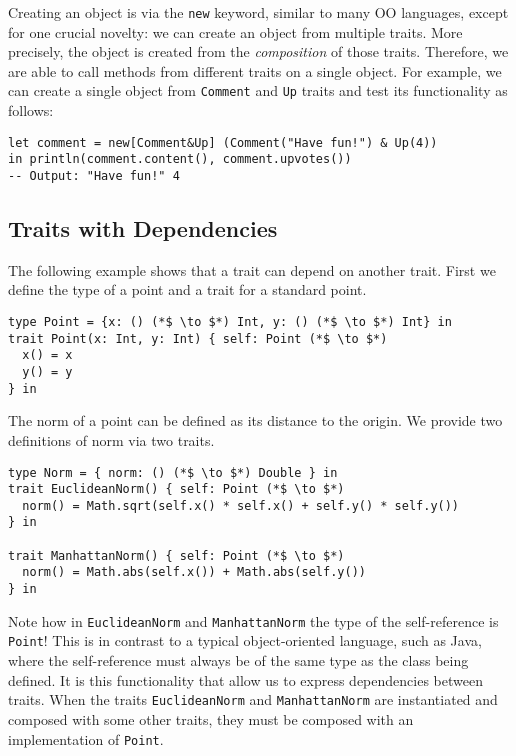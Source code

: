 Creating an object is via the \lstinline$new$ keyword, similar to many OO
languages, except for one crucial novelty: we can create an object from multiple
traits. More precisely, the object is created from the \emph{composition} of
those traits. Therefore, we are able to call methods from different traits on a
single object. For example, we can create a single object from
\lstinline$Comment$  and \lstinline$Up$ traits and test its
functionality as follows:

\begin{lstlisting}
let comment = new[Comment&Up] (Comment("Have fun!") & Up(4))
in println(comment.content(), comment.upvotes())
-- Output: "Have fun!" 4
\end{lstlisting}

\subsection{Traits with Dependencies}
The following example shows that a trait
can depend on another trait. First we define the type of a point and a trait for
a standard point.

\begin{lstlisting}
type Point = {x: () (*$ \to $*) Int, y: () (*$ \to $*) Int} in
trait Point(x: Int, y: Int) { self: Point (*$ \to $*)
  x() = x
  y() = y
} in
\end{lstlisting}

The norm of a point can be defined as its distance to the origin. We provide two
definitions of norm via two traits.

\begin{lstlisting}
type Norm = { norm: () (*$ \to $*) Double } in
trait EuclideanNorm() { self: Point (*$ \to $*)
  norm() = Math.sqrt(self.x() * self.x() + self.y() * self.y())
} in

trait ManhattanNorm() { self: Point (*$ \to $*)
  norm() = Math.abs(self.x()) + Math.abs(self.y())
} in
\end{lstlisting}

Note how in \lstinline$EuclideanNorm$ and \lstinline$ManhattanNorm$
the type of the self-reference is \lstinline$Point$! This is in
contrast to a typical object-oriented language, such as Java, where
the self-reference must always be of the same type as the class being
defined. It is this functionality that allow us to express
dependencies between traits. When the traits \lstinline$EuclideanNorm$
and \lstinline$ManhattanNorm$ are instantiated and composed with some
other traits, they must be composed with an implementation of
\lstinline$Point$.

